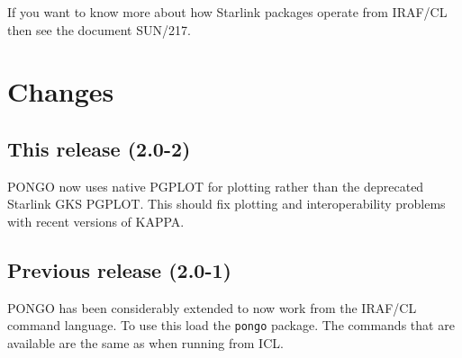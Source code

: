 \documentclass[twoside,11pt]{article}
\newcommand{\xref}[3]{#1}
\renewcommand{\_}{\texttt{\symbol{95}}}
\begin{document}
If you want to know more about how Starlink packages operate from
IRAF/CL then see the document \xref{SUN/217}{sun217}{}.

\section{Changes}
\subsection {This release (2.0-2)}

PONGO now uses native PGPLOT for plotting rather than the deprecated
Starlink GKS PGPLOT. This should fix plotting and interoperability
problems with recent versions of KAPPA.

\subsection{Previous release (2.0-1)}

PONGO has been considerably extended to now work from the IRAF/CL
command language. To use this load the \verb+pongo+ package. The
commands that are available are the same as when running from ICL.
\end{document}
